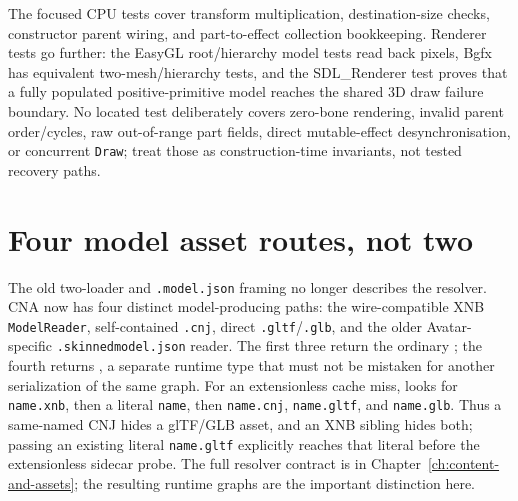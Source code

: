 The focused CPU tests cover transform multiplication, destination-size checks, constructor
parent wiring, and part-to-effect collection bookkeeping. Renderer tests go further: the EasyGL
root/hierarchy model tests read back pixels, Bgfx has equivalent two-mesh/hierarchy tests, and
the SDL\_Renderer test proves that a fully populated positive-primitive model reaches the shared
3D draw failure boundary. No located test deliberately covers zero-bone rendering, invalid
parent order/cycles, raw out-of-range part fields, direct mutable-effect desynchronisation, or
concurrent \texttt{Draw}; treat those as construction-time invariants, not tested recovery
paths.

\section{Four model asset routes, not two}
\label{sec:model-loading}

The old two-loader and \texttt{.model.json} framing no longer describes the resolver.
CNA now has four distinct model-producing paths: the wire-compatible XNB
\texttt{ModelReader}, self-contained \texttt{.cnj}, direct \texttt{.gltf}/\texttt{.glb}, and
the older Avatar-specific \texttt{.skinnedmodel.json} reader. The first three return the
ordinary ; the fourth returns , a separate runtime
type that must not be mistaken for another serialization of the same graph. For an
extensionless cache miss,  looks for \texttt{name.xnb}, then a literal
\texttt{name}, then \texttt{name.cnj}, \texttt{name.gltf}, and \texttt{name.glb}. Thus a
same-named CNJ hides a glTF/GLB asset, and an XNB sibling hides both; passing an existing literal
\texttt{name.gltf} explicitly reaches that literal before the extensionless sidecar probe. The
full resolver contract is in Chapter~\ref{ch:content-and-assets}; the resulting runtime
graphs are the important distinction here.


